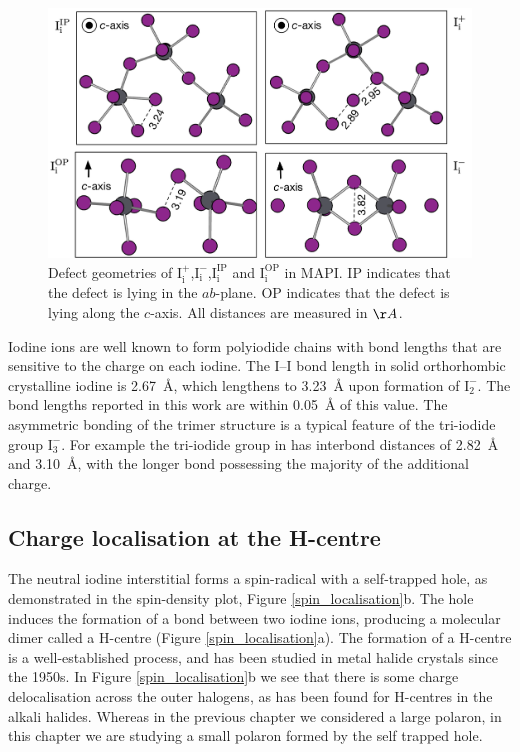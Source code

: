 \begin{figure}[h!]
\centering
  \includegraphics[width=1.0\columnwidth]{figures/ch6/defect_geometries.png}
  \caption[Defect geometries of $\mathrm{I}_\mathrm{i}^+$,$\mathrm{I}_\mathrm{i}^-$ and $\mathrm{I}_\mathrm{i}^0$]{Defect geometries of $\mathrm{I}_\mathrm{i}^+$,$\mathrm{I}_\mathrm{i}^-$,$\mathrm{I}_\mathrm{i}^\mathrm{IP}$ and $\mathrm{I}_\mathrm{i}^\mathrm{OP}$ in MAPI. IP indicates that the defect is lying in the $ab$-plane. OP indicates that the defect is lying along the $c$-axis. All distances are measured in $\AA$.}
\label{relaxation_workflow}
\end{figure}

Iodine ions are well known to form polyiodide chains with bond lengths that are sensitive to the charge on each iodine.
The I--I bond length in solid orthorhombic crystalline iodine is \SI{2.67}{\angstrom}, which lengthens to \SI{3.23}{\angstrom} upon formation of $\mathrm{I}_2^-$.\autocite{Chen1985} The bond lengths reported in this work are within \SI{0.05}{\angstrom} of this value.
The asymmetric bonding of the trimer structure is a typical feature of the tri-iodide group $\mathrm{I}_3^-$. For example the tri-iodide group in  has interbond distances of \SI{2.82}{\angstrom} and \SI{3.10}{\angstrom}, with the longer bond possessing the majority of the additional charge.\autocite{Finney1973}

\subsection{Charge localisation at the H-centre} \label{ss:chglocal}
The neutral iodine interstitial forms a spin-radical with a self-trapped hole, as demonstrated in the spin-density plot, Figure \ref{spin_localisation}b.
The hole induces the formation of a bond between two iodine ions, producing a molecular dimer called a H-centre (Figure \ref{spin_localisation}a). The formation of a H-centre is a well-established process, and has been studied in metal halide crystals since the 1950s.\autocite{Castner1957} In Figure \ref{spin_localisation}b we see that there is some charge delocalisation across the outer halogens, as has been found for H-centres in the alkali halides.\autocite{Shluger1995}
Whereas in the previous chapter we considered a large polaron, in this chapter we are studying a small polaron formed by the self trapped hole.

